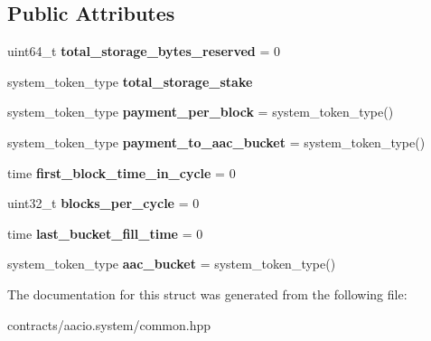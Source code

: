 \subsection*{Public Attributes}
\begin{DoxyCompactItemize}
\item 
\mbox{\label{structaaciosystem_1_1common_1_1aacio__global__state_af9ae12b58845e9aab67dbcde317c22ee}} 
uint64\+\_\+t {\bfseries total\+\_\+storage\+\_\+bytes\+\_\+reserved} = 0
\item 
\mbox{\label{structaaciosystem_1_1common_1_1aacio__global__state_a0590378c22deae075d467c0da099b49b}} 
system\+\_\+token\+\_\+type {\bfseries total\+\_\+storage\+\_\+stake}
\item 
\mbox{\label{structaaciosystem_1_1common_1_1aacio__global__state_a7eea01609269562ef59188bc368acf84}} 
system\+\_\+token\+\_\+type {\bfseries payment\+\_\+per\+\_\+block} = system\+\_\+token\+\_\+type()
\item 
\mbox{\label{structaaciosystem_1_1common_1_1aacio__global__state_a81591d6ebd9bc7af3873baaef9a95547}} 
system\+\_\+token\+\_\+type {\bfseries payment\+\_\+to\+\_\+aac\+\_\+bucket} = system\+\_\+token\+\_\+type()
\item 
\mbox{\label{structaaciosystem_1_1common_1_1aacio__global__state_a8f011a377587e1705b1b5c055e489b25}} 
time {\bfseries first\+\_\+block\+\_\+time\+\_\+in\+\_\+cycle} = 0
\item 
\mbox{\label{structaaciosystem_1_1common_1_1aacio__global__state_ac9fbd733a5c590451a7bfd67fa203ca1}} 
uint32\+\_\+t {\bfseries blocks\+\_\+per\+\_\+cycle} = 0
\item 
\mbox{\label{structaaciosystem_1_1common_1_1aacio__global__state_ae657fbbd885eb15c859ea9794468addb}} 
time {\bfseries last\+\_\+bucket\+\_\+fill\+\_\+time} = 0
\item 
\mbox{\label{structaaciosystem_1_1common_1_1aacio__global__state_aa7cffdb1546c0781ac9cb9826dcda7a8}} 
system\+\_\+token\+\_\+type {\bfseries aac\+\_\+bucket} = system\+\_\+token\+\_\+type()
\end{DoxyCompactItemize}


The documentation for this struct was generated from the following file\+:\begin{DoxyCompactItemize}
\item 
contracts/aacio.\+system/common.\+hpp\end{DoxyCompactItemize}
